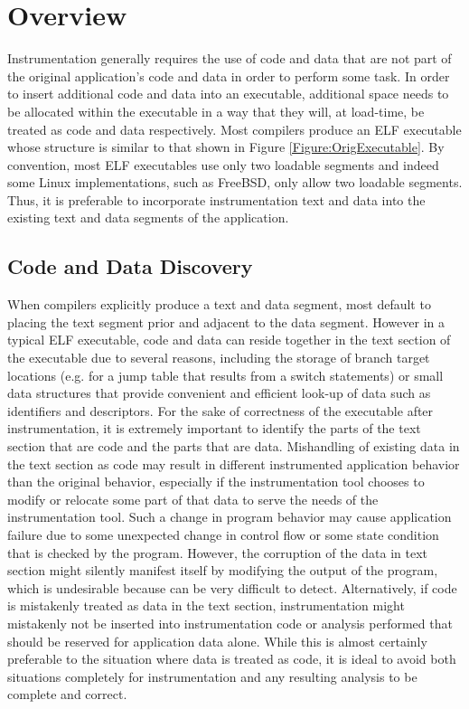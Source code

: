 \section{Overview}

Instrumentation generally requires the use of code and data that are not part of the original
application's code and data in order to perform some task. In order to insert additional code
and data into an executable, additional space needs to be allocated within the executable in a way that they
will, at load-time, be treated as code and data respectively. Most compilers produce an ELF executable whose
structure is similar to that shown in Figure \ref{Figure:OrigExecutable}. By
convention, most ELF executables use only two loadable segments and indeed some Linux
implementations, such as FreeBSD, only allow two loadable segments. Thus, it is
preferable to incorporate instrumentation text and data into the
existing text and data segments of the application. 

\subsection{Code and Data Discovery}
When compilers explicitly produce a text and data segment, most default to placing the text segment prior and adjacent to the data segment.
However in a typical ELF executable, code and data can reside together in the text section of the executable due to several reasons, including
the storage of branch target locations (e.g. for a jump table that results from a switch statements) or small data structures 
that provide convenient and efficient look-up of data such as identifiers and descriptors. 
For the sake of correctness of the executable after instrumentation, it is extremely important to identify the parts of the text 
section that are code and the parts that are data. Mishandling of existing data in the text section as code 
may result in different instrumented application behavior than the original behavior, especially 
if the instrumentation tool chooses to modify or relocate some part of that data 
to serve the needs of the instrumentation tool. 
Such a change in program behavior may cause application failure due to some unexpected change in control flow 
or some state condition that is checked by the program.
However, the corruption of the data in text section might silently manifest itself by modifying the output of the
program, which is undesirable because can be very difficult to detect. Alternatively, if code is mistakenly treated as data in the text section, instrumentation might
mistakenly not be inserted into instrumentation code or analysis performed that should be reserved for
application data alone. While this is almost certainly preferable to the situation where data is treated as code, it
is ideal to avoid both situations completely for instrumentation and any resulting analysis to be complete and correct.

